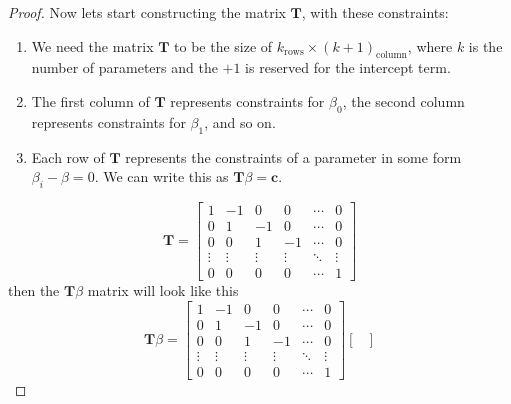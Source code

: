 \documentclass[12pt]{article}
\newcommand{\T}{\mathbf{T}}
\begin{document}
\begin{enumerate}[1.]
\begin{enumerate}[a)]
\begin{proof}
                        Now lets start constructing the matrix $\T$, with these constraints:
                        \begin{enumerate}
                            \item We need the matrix $\T$ to be the size of $k_{\text{rows}} \times (k + 1)_{\text{column}}$, where $k$ is the number of parameters and the 
                            $ + 1$ is reserved for the intercept term.
                            \item The first column of $\T$ represents constraints for $\beta_0$, 
                            the second column represents constraints for $\beta_1$, and so on.
                            \item Each row of $\T$ represents the constraints of a parameter in some form $\beta_i - \beta = 0$. 
                            We can write this as $\T \beta = \mathbf{c}$.
                        \end{enumerate}
                        \[\T = 
                            \begin{bmatrix} 
                                   1 & -1 & 0 & 0 & \cdots & 0 
                                \\ 0 & 1 & -1 & 0 & \cdots & 0 
                                \\ 0 & 0 & 1 & -1 & \cdots & 0 
                                \\ \vdots & \vdots & \vdots & \vdots & \ddots & \vdots 
                                \\ 0 & 0 & 0 & 0 & \cdots & 1 
                            \end{bmatrix}
                        \]
                        then the $\T \beta$ matrix will look like this
                        \[\T \beta = 
                            \begin{bmatrix} 
                                   1 & -1 & 0 & 0 & \cdots & 0 
                                \\ 0 & 1 & -1 & 0 & \cdots & 0 
                                \\ 0 & 0 & 1 & -1 & \cdots & 0 
                                \\ \vdots & \vdots & \vdots & \vdots & \ddots & \vdots 
                                \\ 0 & 0 & 0 & 0 & \cdots & 1 
                            \end{bmatrix}
                            \begin{bmatrix} 

\end{bmatrix}\]
\end{proof}
\end{enumerate}
\end{enumerate}
\end{document}
